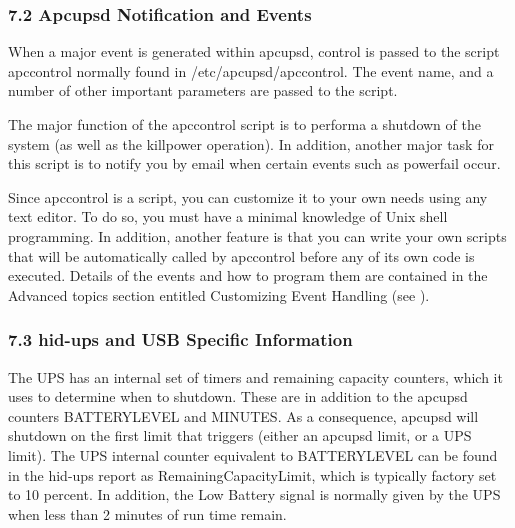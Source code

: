 {{{{\subsubsection*{7.2 Apcupsd Notification and Events}

\label{index-Notification-116}
\label{index-Events-117}
When a major event is generated within apcupsd, control is passed to the
script apccontrol normally found in /etc/apcupsd/apccontrol. The event name,
and a number of other important parameters are passed to the script.  

The major function of the apccontrol script is to performa a shutdown of the
system (as well as the killpower operation). In addition, another major task
for this script is to notify you by email when certain events such as
powerfail occur.  

Since apccontrol is a script, you can customize it to your own needs using any
text editor. To do so, you must have a minimal knowledge of Unix shell
programming. In addition, another feature is that you can write your own
scripts that will be automatically called by apccontrol before any of its own
code is executed. Details of the events and how to program them are contained
in the Advanced topics section entitled Customizing Event Handling (see 
). 

\label{hid_002dups-and-USB-Specific-Information}

\subsubsection*{7.3 hid-ups and USB Specific Information}

\label{index-hid_002dups-118}
The UPS has an internal set of timers and remaining capacity counters, which
it uses to determine when to shutdown. These are in addition to the apcupsd
counters BATTERYLEVEL and MINUTES.  As a consequence, apcupsd will shutdown on
the first limit that triggers (either an apcupsd limit, or a UPS limit). The
UPS internal counter equivalent to BATTERYLEVEL can be found in the hid-ups
report as RemainingCapacityLimit, which is typically factory set to 10
percent. In addition, the Low Battery signal is normally given by the UPS when
less than 2 minutes of run time remain. 

}}}}
